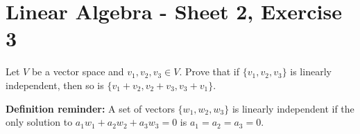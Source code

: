\documentclass{article}
\begin{document}
\section*{Linear Algebra - Sheet 2, Exercise 3}

Let $V$ be a vector space and $v_1, v_2, v_3 \in V$. Prove that if $\{v_1, v_2, v_3\}$ is linearly independent, then so is $\{v_1 + v_2, v_2 + v_3, v_3 + v_1\}$.

\textbf{Definition reminder:} A set of vectors $\{w_1, w_2, w_3\}$ is linearly independent if the only solution to $a_1 w_1 + a_2 w_2 + a_3 w_3 = 0$ is $a_1 = a_2 = a_3 = 0$.
\end{document}
